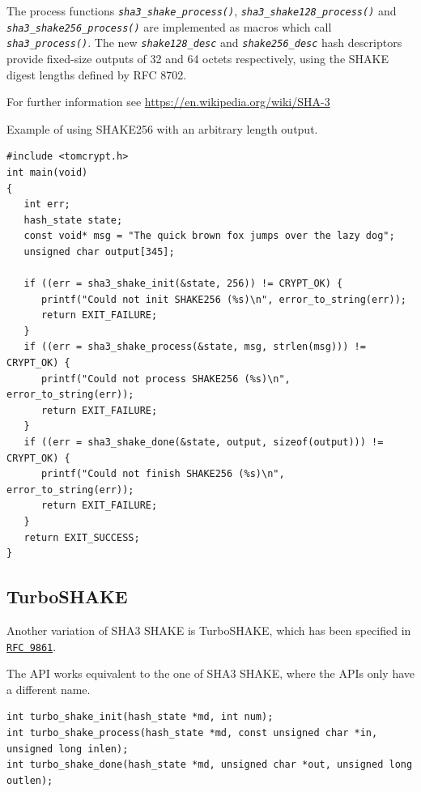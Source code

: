 \documentclass[synpaper]{book}
\newcommand{\code}[1]{\texttt{\textit{#1}}}
\begin{document}
The process functions \code{sha3\_shake\_process()}, \code{sha3\_shake128\_process()} and \code{sha3\_shake256\_process()}
are implemented as macros which call \code{sha3\_process()}. The new \code{shake128\_desc} and \code{shake256\_desc}
hash descriptors provide fixed-size outputs of 32 and 64 octets respectively, using the SHAKE digest lengths defined by RFC 8702.

For further information see \url{https://en.wikipedia.org/wiki/SHA-3}

Example of using SHAKE256 with an arbitrary length output.

\begin{small}
\begin{verbatim}
#include <tomcrypt.h>
int main(void)
{
   int err;
   hash_state state;
   const void* msg = "The quick brown fox jumps over the lazy dog";
   unsigned char output[345];

   if ((err = sha3_shake_init(&state, 256)) != CRYPT_OK) {
      printf("Could not init SHAKE256 (%s)\n", error_to_string(err));
      return EXIT_FAILURE;
   }
   if ((err = sha3_shake_process(&state, msg, strlen(msg))) != CRYPT_OK) {
      printf("Could not process SHAKE256 (%s)\n", error_to_string(err));
      return EXIT_FAILURE;
   }
   if ((err = sha3_shake_done(&state, output, sizeof(output))) != CRYPT_OK) {
      printf("Could not finish SHAKE256 (%s)\n", error_to_string(err));
      return EXIT_FAILURE;
   }
   return EXIT_SUCCESS;
}
\end{verbatim}
\end{small}

\subsection{TurboSHAKE}
Another variation of SHA3 SHAKE is TurboSHAKE, which has been specified in \href{https://datatracker.ietf.org/doc/rfc9861/}{\texttt{RFC 9861}}.

The API works equivalent to the one of SHA3 SHAKE, where the APIs only have a different name.

\begin{small}
\begin{verbatim}
int turbo_shake_init(hash_state *md, int num);
int turbo_shake_process(hash_state *md, const unsigned char *in, unsigned long inlen);
int turbo_shake_done(hash_state *md, unsigned char *out, unsigned long outlen);
\end{verbatim}
\end{small}
\end{document}
